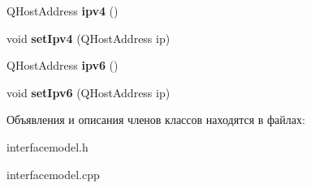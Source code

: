 \begin{DoxyCompactItemize}
\item 
Q\+Host\+Address {\bfseries ipv4} ()\hypertarget{class_interface_model_a1601e72efd97a651dbc4541387afe47b}{}\label{class_interface_model_a1601e72efd97a651dbc4541387afe47b}

\item 
void {\bfseries set\+Ipv4} (Q\+Host\+Address ip)\hypertarget{class_interface_model_a0e4826c6024f3ea4a229df52809f8c17}{}\label{class_interface_model_a0e4826c6024f3ea4a229df52809f8c17}

\item 
Q\+Host\+Address {\bfseries ipv6} ()\hypertarget{class_interface_model_a4c5651b1ced869c27937443f073dd609}{}\label{class_interface_model_a4c5651b1ced869c27937443f073dd609}

\item 
void {\bfseries set\+Ipv6} (Q\+Host\+Address ip)\hypertarget{class_interface_model_af486a90f09c150d2e45a780b73145bb0}{}\label{class_interface_model_af486a90f09c150d2e45a780b73145bb0}

\end{DoxyCompactItemize}


Объявления и описания членов классов находятся в файлах\+:\begin{DoxyCompactItemize}
\item 
interfacemodel.\+h\item 
interfacemodel.\+cpp\end{DoxyCompactItemize}
